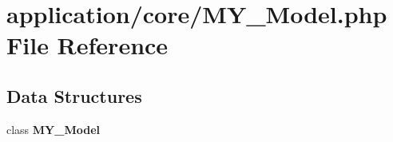 \section{application/core/\-M\-Y\-\_\-\-Model.php File Reference}
\label{_m_y___model_8php}
\subsection*{Data Structures}
\begin{DoxyCompactItemize}
\item 
class {\bf M\-Y\-\_\-\-Model}
\end{DoxyCompactItemize}
